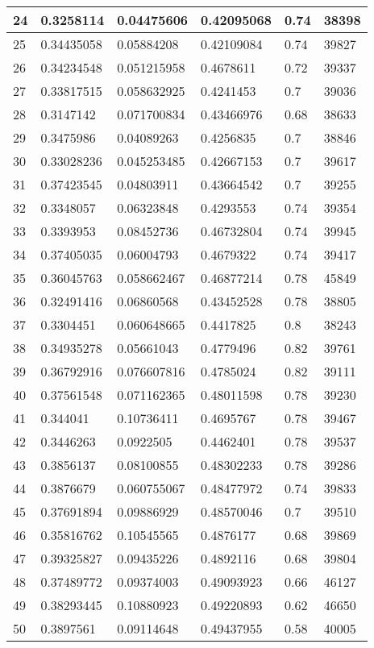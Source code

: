 \begin{longtable}{|l|l|l|l|l|l|}
24 & 0.3258114 & 0.04475606 & 0.42095068 & 0.74 & 38398 \\ \hline 
25 & 0.34435058 & 0.05884208 & 0.42109084 & 0.74 & 39827 \\ \hline 
26 & 0.34234548 & 0.051215958 & 0.4678611 & 0.72 & 39337 \\ \hline 
27 & 0.33817515 & 0.058632925 & 0.4241453 & 0.7 & 39036 \\ \hline 
28 & 0.3147142 & 0.071700834 & 0.43466976 & 0.68 & 38633 \\ \hline 
29 & 0.3475986 & 0.04089263 & 0.4256835 & 0.7 & 38846 \\ \hline 
30 & 0.33028236 & 0.045253485 & 0.42667153 & 0.7 & 39617 \\ \hline 
31 & 0.37423545 & 0.04803911 & 0.43664542 & 0.7 & 39255 \\ \hline 
32 & 0.3348057 & 0.06323848 & 0.4293553 & 0.74 & 39354 \\ \hline 
33 & 0.3393953 & 0.08452736 & 0.46732804 & 0.74 & 39945 \\ \hline 
34 & 0.37405035 & 0.06004793 & 0.4679322 & 0.74 & 39417 \\ \hline 
35 & 0.36045763 & 0.058662467 & 0.46877214 & 0.78 & 45849 \\ \hline 
36 & 0.32491416 & 0.06860568 & 0.43452528 & 0.78 & 38805 \\ \hline 
37 & 0.3304451 & 0.060648665 & 0.4417825 & 0.8 & 38243 \\ \hline 
38 & 0.34935278 & 0.05661043 & 0.4779496 & 0.82 & 39761 \\ \hline 
39 & 0.36792916 & 0.076607816 & 0.4785024 & 0.82 & 39111 \\ \hline 
40 & 0.37561548 & 0.071162365 & 0.48011598 & 0.78 & 39230 \\ \hline 
41 & 0.344041 & 0.10736411 & 0.4695767 & 0.78 & 39467 \\ \hline 
42 & 0.3446263 & 0.0922505 & 0.4462401 & 0.78 & 39537 \\ \hline 
43 & 0.3856137 & 0.08100855 & 0.48302233 & 0.78 & 39286 \\ \hline 
44 & 0.3876679 & 0.060755067 & 0.48477972 & 0.74 & 39833 \\ \hline 
45 & 0.37691894 & 0.09886929 & 0.48570046 & 0.7 & 39510 \\ \hline 
46 & 0.35816762 & 0.10545565 & 0.4876177 & 0.68 & 39869 \\ \hline 
47 & 0.39325827 & 0.09435226 & 0.4892116 & 0.68 & 39804 \\ \hline 
48 & 0.37489772 & 0.09374003 & 0.49093923 & 0.66 & 46127 \\ \hline 
49 & 0.38293445 & 0.10880923 & 0.49220893 & 0.62 & 46650 \\ \hline 
50 & 0.3897561 & 0.09114648 & 0.49437955 & 0.58 & 40005 \\ \hline 
\end{longtable}